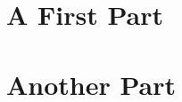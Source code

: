 \documentclass[b5paper,10pt]{book}
\begin{document}
\frontmatter


\tableofcontents


\mainmatter




\part{A First Part}


\part{Another Part}






\backmatter


\end{document}
